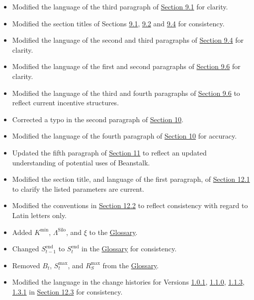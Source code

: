 \documentclass[class=article, crop=false]{standalone}
\begin{document}
\begin{itemize}[topsep=0pt, itemsep=3pt,leftmargin=16pt]
\begin{itemize}
        \item Modified the language of the third paragraph of \hyperlink{subsection.9.1}{Section 9.1} for clarity.
        \item Modified the section titles of Sections \hyperlink{subsection.9.1}{9.1}, \hyperlink{subsection.9.2}{9.2} and \hyperlink{subsection.9.4}{9.4} for consistency.
        \item Modified the language of the second and third paragraphs of \hyperlink{subsection.9.4}{Section 9.4} for clarity.
        \item Modified the language of the first and second paragraphs of \hyperlink{subsection.9.6}{Section 9.6} for clarity.
        \item Modified the language of the third and fourth paragraphs of \hyperlink{subsection.9.6}{Section 9.6} to reflect current incentive structures.
        \item Corrected a typo in the second paragraph of \hyperlink{section.10}{Section 10}.
        \item Modified the language of the fourth paragraph of \hyperlink{section.10}{Section 10} for accuracy.
        \item Updated the fifth paragraph of \hyperlink{section.11}{Section 11} to reflect an updated understanding of potential uses of Beanstalk. 
        \item Modified the section title, and language of the first paragraph, of \hyperlink{subsection.12.1}{Section 12.1} to clarify the listed parameters are current.
        \item Modified the conventions in \hyperlink{subsection.12.2}{Section 12.2} to reflect consistency with regard to Latin letters only.
        \item Added $K^{\text{min}}$, $\Lambda^{\text{Silo}}$, and $\xi$ to the \hyperlink{subsection.14.11}{Glossary}. 
        \item Changed $S_{t-1}^{\text{end}}$ to $S_t^{\text{end}}$ in the \hyperlink{subsection.14.11}{Glossary} for consistency. 
        \item Removed $B_t$, $S_t^{\text{max}}$, and $R_S^{\text{max}}$ from the \hyperlink{subsection.14.11}{Glossary}. 
        \item Modified the language in the change histories for Versions \href{https://github.com/BeanstalkFarms/Beanstalk-Whitepaper/blob/master/version-history/beanstalk1_0_1.pdf}{1.0.1}, \href{https://github.com/BeanstalkFarms/Beanstalk-Whitepaper/blob/master/version-history/beanstalk1_1_0.pdf}{1.1.0}, \href{https://github.com/BeanstalkFarms/Beanstalk-Whitepaper/blob/master/version-history/beanstalk1_1_3.pdf}{1.1.3}, \href{https://github.com/BeanstalkFarms/Beanstalk-Whitepaper/blob/master/version-history/beanstalk1_3_1.pdf}{1.3.1} in \hyperlink{subsection.12.3}{Section 12.3} for consistency.
    \end{itemize}
    

\end{itemize}
\end{document}
